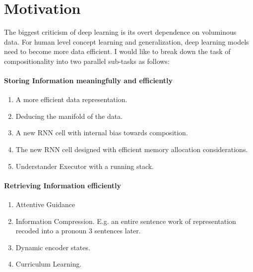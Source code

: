 \section{Motivation}\label{sec:motivate}
The biggest criticism of deep learning is its overt dependence on voluminous data. For human level concept learning and generalization, deep learning models need to become more data efficient. I would like to break down the task of compositionality into two parallel sub-tasks as follows:
\paragraph{Storing Information meaningfully and efficiently}
\begin{enumerate}
	\item A more efficient data representation.
	\item Deducing the manifold of the data.
	\item A new RNN cell with internal bias towards composition.
	\item The new RNN cell designed with efficient memory allocation considerations.
	\item Understander Executor with a running stack.		
\end{enumerate}
\paragraph{Retrieving Information efficiently}
\begin{enumerate}
	\item Attentive Guidance
	\item Information Compression. E.g. an entire sentence work of representation recoded into a pronoun 3 sentences later.
	\item Dynamic encoder states.
	\item Curriculum Learning.
\end{enumerate}
